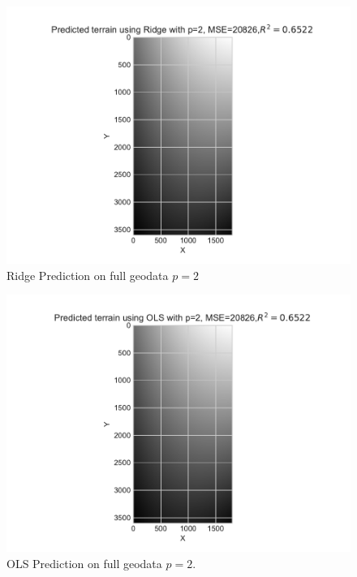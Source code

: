 \documentclass[%
oneside,                 %
final,                   %
10pt]{article}
\begin{document}
\begin{appendices}
\begin{figure}[!h]
        \centering 
         \includegraphics[scale=0.7]{../Results/Part_g/Ridge_full.pdf} 
        \caption{Ridge Prediction on full geodata $p=2$}
        \label{fig:Ridge_full}   
\end{figure}  

\begin{figure}[!h]
        \centering 
         \includegraphics[scale=0.7]{../Results/Part_g/OLS_full.pdf} 
        \caption{OLS Prediction on full geodata $p=2$.}
        \label{fig:OLS_full}   
\end{figure}  


\end{appendices}
\end{document}
